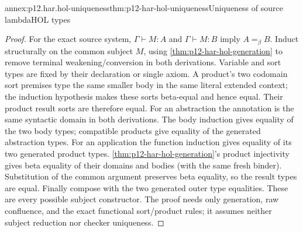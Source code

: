 \begin{annexitem}{annex:p12.har.hol-uniqueness}{thm:p12-har-hol-uniqueness}{Uniqueness of source lambdaHOL types}
\begin{proof}
For the exact source system, \(\Gamma\vdash M:A\) and
\(\Gamma\vdash M:B\) imply \(A=_\beta B\).
Induct structurally on the common subject \(M\), using \cref{thm:p12-har-hol-generation} to remove
terminal weakening/conversion in both derivations. Variable and sort
types are fixed by their declaration or single axiom. A product's two
codomain sort premises type the same smaller body in the same literal
extended context; the induction hypothesis makes these sorts beta-equal
and hence equal. Their product result sorts are therefore equal.
For an abstraction the annotation is the same syntactic domain in both
derivations. The body induction gives equality of the two body types;
compatible products give equality of the generated abstraction types.
For an application the function induction gives equality of its two
generated product types. \cref{thm:p12-har-hol-generation}'s product injectivity gives beta equality of
their domains and bodies (with the same fresh binder). Substitution of
the common argument preserves beta equality, so the result types are
equal. Finally compose with the two generated outer type equalities.
These are every possible subject constructor. The proof needs only
generation, raw confluence, and the exact functional sort/product rules;
it assumes neither subject reduction nor checker uniqueness.
\end{proof}
\end{annexitem}

